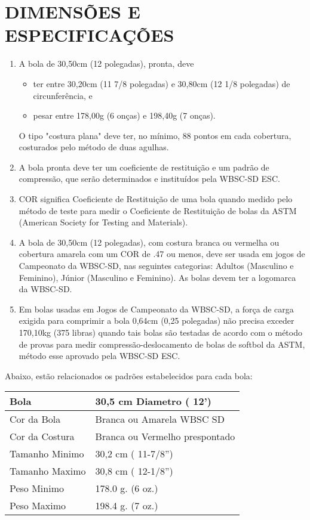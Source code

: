 \section{DIMENSÕES E ESPECIFICAÇÕES}

\begin{enumerate}[label=(\arabic*)]
	\item  A bola de 30,50cm (12 polegadas), pronta, deve

	\begin{itemize}
		\item ter entre 30,20cm (11 7/8 polegadas) e 30,80cm (12 1/8 polegadas) de circunferência, e
		\item pesar entre 178,00g (6 \textonequarter{} onças) e 198,40g (7 onças).
	\end{itemize}


	O tipo "costura plana" deve ter, no mínimo, 88 pontos em cada cobertura, costurados pelo método de duas agulhas.
	\item  A bola pronta deve ter um coeficiente de restituição e um padrão de compressão, que serão determinados e instituídos pela WBSC-SD \gls{ESC}.
	\item  COR significa Coeficiente de Restituição de uma bola quando medido pelo método de teste para medir o Coeficiente de Restituição de bolas da ASTM (American Society for Testing and Materials).
	\item  A bola de 30,50cm (12 polegadas), com costura branca ou vermelha ou cobertura amarela com um COR de .47 ou menos, deve ser usada em jogos de Campeonato da WBSC-SD, nas seguintes categorias: Adultos (Masculino e Feminino), Júnior (Masculino e Feminino). As bolas devem ter a logomarca da WBSC-SD.
	\item  Em bolas usadas em Jogos de Campeonato da WBSC-SD, a força de carga exigida para comprimir a bola 0,64cm (0,25 polegadas) não precisa exceder 170,10kg (375 libras) quando tais bolas são testadas de acordo com o método de provas para medir compressão-deslocamento de bolas de softbol da ASTM, método esse aprovado pela WBSC-SD \gls{ESC}.
\end{enumerate}

 Abaixo, estão relacionados os padrões estabelecidos para cada bola:

 \begin{center}
 \begin{tabular}{ll}\hline
	Bola&  30,5 cm Diametro ( 12')\\\hline
	Cor da Bola&  Branca ou Amarela WBSC SD\\\hline
	Cor da Costura &  Branca ou Vermelho prespontado\\\hline
	Tamanho Minimo & 30,2 cm ( 11-7/8'')\\\hline
	Tamanho Maximo& 30,8 cm ( 12-1/8'')\\\hline
	Peso Minimo & 178.0 g. (6 \textonequarter{}  oz.)\\\hline
	Peso Maximo & 198.4 g. (7 oz.)\\\hline
\end{tabular}
 \end{center}



